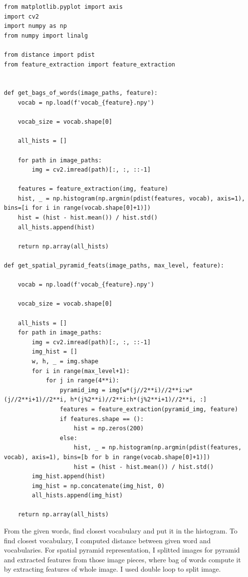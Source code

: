 \begin{lstlisting}
from matplotlib.pyplot import axis
import cv2
import numpy as np
from numpy import linalg

from distance import pdist
from feature_extraction import feature_extraction


def get_bags_of_words(image_paths, feature):
    vocab = np.load(f'vocab_{feature}.npy')

    vocab_size = vocab.shape[0]

    all_hists = []

    for path in image_paths:
        img = cv2.imread(path)[:, :, ::-1]

    features = feature_extraction(img, feature)
    hist, _ = np.histogram(np.argmin(pdist(features, vocab), axis=1), bins=[i for i in range(vocab.shape[0]+1)])
    hist = (hist - hist.mean()) / hist.std()
    all_hists.append(hist)

    return np.array(all_hists)
   
def get_spatial_pyramid_feats(image_paths, max_level, feature):

    vocab = np.load(f'vocab_{feature}.npy')

    vocab_size = vocab.shape[0]

    all_hists = []
    for path in image_paths:
        img = cv2.imread(path)[:, :, ::-1]
        img_hist = []
        w, h, _ = img.shape
        for i in range(max_level+1):
            for j in range(4**i):
                pyramid_img = img[w*(j//2**i)//2**i:w*(j//2**i+1)//2**i, h*(j%2**i)//2**i:h*(j%2**i+1)//2**i, :]
                features = feature_extraction(pyramid_img, feature)
                if features.shape == ():
                    hist = np.zeros(200)
                else:
                    hist, _ = np.histogram(np.argmin(pdist(features, vocab), axis=1), bins=[b for b in range(vocab.shape[0]+1)])
                    hist = (hist - hist.mean()) / hist.std()
        img_hist.append(hist) 
        img_hist = np.concatenate(img_hist, 0)
        all_hists.append(img_hist)

    return np.array(all_hists)
\end{lstlisting}
From the given words, find closest vocabulary and put it in the histogram. To find closest vocabulary, I computed distance between given word and vocabularies. 
For spatial pyramid representation, I splitted images for pyramid and extracted features from those image pieces, where bag of words compute it by extracting features of whole image. I used double loop to split image. 

